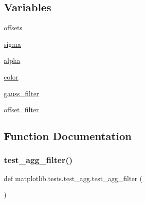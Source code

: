 \subsection*{Variables}
\begin{DoxyCompactItemize}
\item 
\hyperlink{namespacematplotlib_1_1tests_1_1test__agg_a012bdcd9f2c6d061ef356b755eff553a}{offsets}
\item 
\hyperlink{namespacematplotlib_1_1tests_1_1test__agg_a7b2bab59b58350292a5186a89d63e392}{sigma}
\item 
\hyperlink{namespacematplotlib_1_1tests_1_1test__agg_a76e8681e57cffa630103a9a676149fe4}{alpha}
\item 
\hyperlink{namespacematplotlib_1_1tests_1_1test__agg_ac5f51d3d9fe79bb8640b58200db7ddeb}{color}
\item 
\hyperlink{namespacematplotlib_1_1tests_1_1test__agg_a2656220d3d614b503bed3da1bf3adbcc}{gauss\+\_\+filter}
\item 
\hyperlink{namespacematplotlib_1_1tests_1_1test__agg_a2d366e53324bb721274d2b87973c558c}{offset\+\_\+filter}
\end{DoxyCompactItemize}


\subsection{Function Documentation}
\mbox{\label{namespacematplotlib_1_1tests_1_1test__agg_a46248d37f0f024c81d958bb5be119e0e}} 
\subsubsection{\texorpdfstring{test\+\_\+agg\+\_\+filter()}{test\_agg\_filter()}}
{\footnotesize\ttfamily def matplotlib.\+tests.\+test\+\_\+agg.\+test\+\_\+agg\+\_\+filter (\begin{DoxyParamCaption}{ }\end{DoxyParamCaption})}

\mbox{\label{namespacematplotlib_1_1tests_1_1test__agg_a85befbddd2b567496eee05c05ca620ef}} 
